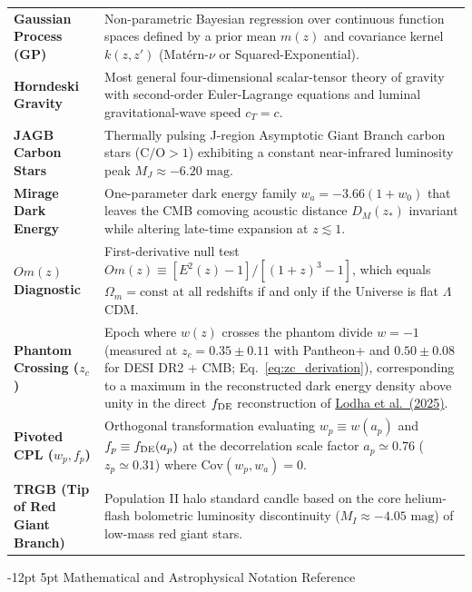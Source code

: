 \documentclass[11pt,letterpaper]{article}
\makeatletter
\renewcommand{\subsection}{\@startsection{subsection}{2}{\z@}%
  {-12pt \@plus -3pt \@minus -1pt}%
  {5pt \@plus 1pt}%
  {\normalfont\large\bfseries\color{tealaccent}}}
\makeatother
\begin{document}
\begin{table}[!htbp]
\begin{tabularx}{\textwidth}{>{\bfseries\color{primary}}p{} X}
Gaussian Process (GP) & Non-parametric Bayesian regression over continuous function spaces defined by a prior mean $m(z)$ and covariance kernel $k(z,z')$ (Matérn-$\nu$ or Squared-Exponential). \\
Horndeski Gravity & Most general four-dimensional scalar-tensor theory of gravity with second-order Euler-Lagrange equations and luminal gravitational-wave speed $c_T = c$. \\
JAGB Carbon Stars & Thermally pulsing J-region Asymptotic Giant Branch carbon stars ($\text{C/O} > 1$) exhibiting a constant near-infrared luminosity peak $M_J \approx -6.20\text{ mag}$. \\
Mirage Dark Energy & One-parameter dark energy family $w_a = -3.66(1+w_0)$ that leaves the CMB comoving acoustic distance $D_M(z_*)$ invariant while altering late-time expansion at $z \lesssim 1$. \\
$Om(z)$ Diagnostic & First-derivative null test $Om(z) \equiv [E^2(z)-1]/[(1+z)^3-1]$, which equals $\Omega_m = \text{const}$ at all redshifts if and only if the Universe is flat $\Lambda$CDM. \\
Phantom Crossing ($z_c$) & Epoch where $w(z)$ crosses the phantom divide $w = -1$ (measured at $z_c = 0.35 \pm 0.11$ with Pantheon+ and $0.50 \pm 0.08$ for DESI DR2 + CMB; Eq.~\ref{eq:zc_derivation}), corresponding to a maximum in the reconstructed dark energy density above unity in the direct $f_{\rm DE}$ reconstruction of \href{https://arxiv.org/abs/2503.14743}{Lodha et al.\ (2025)}. \\
Pivoted CPL ($w_p, f_p$) & Orthogonal transformation evaluating $w_p \equiv w(a_p)$ and $f_p \equiv f_{\rm DE}(a_p)$ at the decorrelation scale factor $a_p \simeq 0.76$ ($z_p \simeq 0.31$) where $\text{Cov}(w_p, w_a) = 0$. \\
TRGB (Tip of Red Giant Branch) & Population II halo standard candle based on the core helium-flash bolometric luminosity discontinuity ($M_I \approx -4.05\text{ mag}$) of low-mass red giant stars. \\
\bottomrule
\end{tabularx}
\end{table}

\subsection{Mathematical and Astrophysical Notation Reference}
\end{document}
